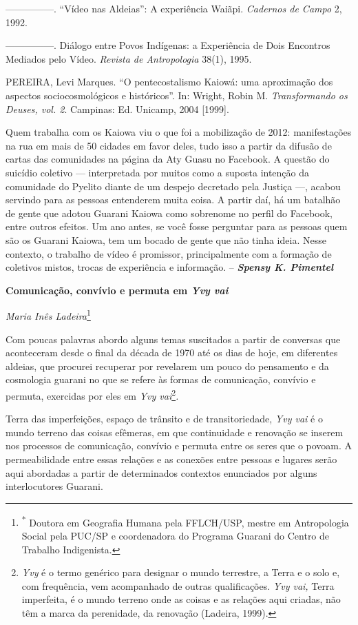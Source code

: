 ---------------. ``Vídeo nas Aldeias'': A experiência Waiãpi.
\emph{Cadernos de Campo} 2, 1992.

---------------. Diálogo entre Povos Indígenas: a Experiência de Dois
Encontros Mediados pelo Vídeo. \emph{Revista de Antropologia} 38(1),
1995.

PEREIRA, Levi Marques. ``O pentecostalismo Kaiowá: uma aproximação dos
aspectos sociocosmológicos e históricos''. In: Wright, Robin M.
\emph{Transformando os Deuses, vol. 2}. Campinas: Ed. Unicamp, 2004
{[}1999{]}.

Quem trabalha com os Kaiowa viu o que foi a mobilização de 2012:
manifestações na rua em mais de 50 cidades em favor deles, tudo isso a
partir da difusão de cartas das comunidades na página da Aty Guasu no
Facebook. A questão do suicídio coletivo --- interpretada por muitos
como a suposta intenção da comunidade do Pyelito diante de um despejo
decretado pela Justiça ---, acabou servindo para as pessoas entenderem
muita coisa. A partir daí, há um batalhão de gente que adotou Guarani
Kaiowa como sobrenome no perfil do Facebook, entre outros efeitos. Um
ano antes, se você fosse perguntar para as pessoas quem são os Guarani
Kaiowa, tem um bocado de gente que não tinha ideia. Nesse contexto, o
trabalho de vídeo é promissor, principalmente com a formação de
coletivos mistos, trocas de experiência e informação. --
\emph{\textbf{Spensy K. Pimentel }}

\textbf{Comunicação, convívio e permuta em \emph{Yvy vai}}

\emph{Maria Inês Ladeira}\footnote{\textsuperscript{*} Doutora em
  Geografia Humana pela FFLCH/USP, mestre em Antropologia Social pela
  PUC/SP e coordenadora do Programa Guarani do Centro de Trabalho
  Indigenista.}

Com poucas palavras abordo alguns temas suscitados a partir de conversas
que aconteceram desde o final da década de 1970 até os dias de hoje, em
diferentes aldeias, que procurei recuperar por revelarem um pouco do
pensamento e da cosmologia guarani no que se refere às formas de
comunicação, convívio e permuta, exercidas por eles em \emph{Yvy
vai}\footnote{\emph{Yvy} é o termo genérico para designar o mundo
  terrestre, a Terra e o solo e, com frequência, vem acompanhado de
  outras qualificações. \emph{Yvy vai,} Terra imperfeita, é o mundo
  terreno onde as coisas e as relações aqui criadas, não têm a marca da
  perenidade, da renovação (Ladeira, 1999).}\emph{.}

Terra das imperfeições, espaço de trânsito e de transitoriedade,
\emph{Yvy vai} é o mundo terreno das coisas efêmeras, em que
continuidade e renovação se inserem nos processos de comunicação,
convívio e permuta entre os seres que o povoam. A permeabilidade entre
essas relações e as conexões entre pessoas e lugares serão aqui
abordadas a partir de determinados contextos enunciados por alguns
interlocutores Guarani.

